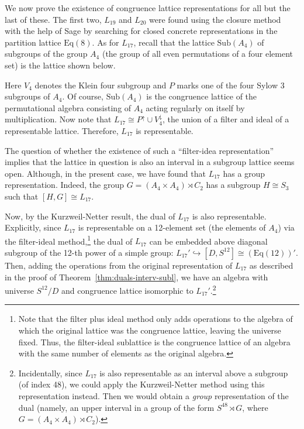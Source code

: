\documentclass[cm,dissertation]{uhthesis}
\theoremstyle{plain}
\theoremstyle{definition}
\theoremstyle{remark}
\numberwithin{theorem}{section}
\numberwithin{claim}{chapter}
\numberwithin{equation}{section}
\numberwithin{conjecture}{chapter}
\newcommand{\<}{\ensuremath{\langle}}
\renewcommand{\>}{\ensuremath{\rangle}}
\newcommand{\Eq}{\ensuremath{\mathrm{Eq}}}
\newcommand{\Sub}{\ensuremath{\mathrm{Sub}}}
\newcommand{\0}{\ensuremath{\mathbf{0}}}
\newcommand{\1}{\ensuremath{\mathbf{1}}}
\newcommand{\2}{\ensuremath{\mathbf{2}}}
\newcommand{\3}{\ensuremath{\mathbf{3}}}
\newcommand{\4}{\ensuremath{\mathbf{4}}}
\newcommand{\5}{\ensuremath{\mathbf{5}}}
\begin{document}
We now prove the existence of congruence lattice representations for all but the
last of these.  The first two, $L_{19}$ and $L_{20}$ were found using the
closure method with the help of Sage by searching for closed concrete
representations in the partition lattice $\Eq(8)$.
As for $L_{17}$, recall that the lattice $\Sub(A_4)$ of
subgroups of the group $A_4$ (the group of all even permutations of a four
element set) is the lattice shown below. 
        \begin{center}
        \end{center}
Here $V_4$ denotes the Klein four subgroup and $P$ marks one of the four Sylow 3
subgroups of $A_4$.
Of course, $\Sub(A_4)$ is the congruence lattice of the permutational algebra
consisting of $A_4$ acting regularly on itself by multiplication.
Now note that $L_{17} \cong P^\uparrow \cup V_4^\downarrow$, the union of a
filter and ideal of a representable lattice. Therefore, $L_{17}$ is representable.

The question of whether the existence of such a ``filter-idea
representation'' implies that the lattice in question is also an interval in a subgroup
lattice seems open.  Although, in the present case, we have found that $L_{17}$
has a group representation.  Indeed, the group 
$G = (A_4 \times A_4) \rtimes C_2$ 
has a subgroup $H\cong S_3$ such that $[H,G]\cong L_{17}$.

%
%
%
Now, by the Kurzweil-Netter result, the dual of $L_{17}$ is also representable.
Explicitly, since $L_{17}$ is representable on a 12-element set (the elements of
$A_4$) via the filter-ideal method,\footnote{Note that the filter plus
  ideal method only adds operations to the algebra of which the original lattice
  was the congruence lattice, leaving the universe fixed.  Thus, the
  filter-ideal sublattice is the congruence lattice of an algebra with the same
  number of elements as the original algebra.} 
the dual of $L_{17}$ can be embedded above diagonal subgroup of the 12-th power
of a simple group: $L_{17}' \hookrightarrow [D,S^{12}] \cong (\Eq(12))'$.
Then, adding the operations from the original representation of $L_{17}$ as
described in the proof of Theorem~\ref{thm:duals-interv-subl}, we have an
algebra with universe $S^{12}/D$ and congruence lattice isomorphic to
$L_{17}'$.\footnote{Incidentally, since $L_{17}$ is also representable as an
  interval above a subgroup (of index 48), we could apply the Kurzweil-Netter
  method using this representation instead.  Then we would obtain a
  \emph{group} representation of the dual (namely, an upper interval in a
  group of the form $S^{48} \rtimes G$, where $G = (A_4 \times A_4) \rtimes C_2$).}
\end{document}

